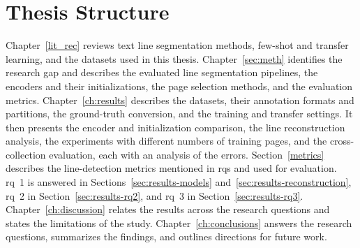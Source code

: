 \section{Thesis Structure}

Chapter~\ref{lit_rec} reviews text line segmentation methods, few-shot and transfer learning, and the datasets used in this thesis. Chapter~\ref{sec:meth} identifies the research gap and describes the evaluated line segmentation pipelines, the encoders and their initializations, the page selection methods, and the evaluation metrics. Chapter~\ref{ch:results} describes the datasets, their annotation formats and partitions, the ground-truth conversion, and the training and transfer settings. It then presents the encoder and initialization comparison, the line reconstruction analysis, the experiments with different numbers of training pages, and the cross-collection evaluation, each with an analysis of the errors. Section~\ref{metrics} describes the line-detection metrics mentioned in \gls{rq}s and used for evaluation. \Gls{rq}~1 is answered in Sections~\ref{sec:results-models} and~\ref{sec:results-reconstruction}, \gls{rq}~2 in Section~\ref{sec:results-rq2}, and \gls{rq}~3 in Section~\ref{sec:results-rq3}. Chapter~\ref{ch:discussion} relates the results across the research questions and states the limitations of the study. Chapter~\ref{ch:conclusions} answers the research questions, summarizes the findings, and outlines directions for future work.
